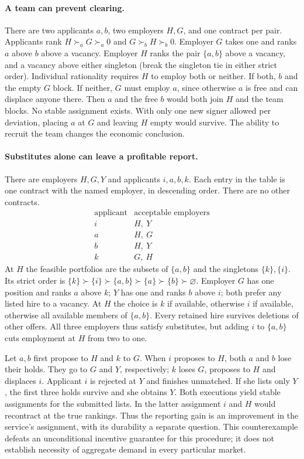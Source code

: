 \documentclass[11pt]{article}
\begin{document}
\paragraph{A team can prevent clearing.}
There are two applicants $a,b$, two employers $H,G$, and one contract per pair. Applicants rank $H\succ_a G\succ_a0$ and $G\succ_b H\succ_b0$. Employer $G$ takes one and ranks $a$ above $b$ above a vacancy. Employer $H$ ranks the pair $\{a,b\}$ above a vacancy, and a vacancy above either singleton (break the singleton tie in either strict order). Individual rationality requires $H$ to employ both or neither. If both, $b$ and the empty $G$ block. If neither, $G$ must employ $a$, since otherwise $a$ is free and can displace anyone there. Then $a$ and the free $b$ would both join $H$ and the team blocks. No stable assignment exists. With only one new signer allowed per deviation, placing $a$ at $G$ and leaving $H$ empty would survive. The ability to recruit the team changes the economic conclusion.

\paragraph{Substitutes alone can leave a profitable report.}
There are employers $H,G,Y$ and applicants $i,a,b,k$. Each entry in the table is one contract with the named employer, in descending order. There are no other contracts.
\[
\begin{array}{c|l}
\text{applicant}&\text{acceptable employers}\\ \hline
 i&H,\ Y\\ a&H,\ G\\ b&H,\ Y\\ k&G,\ H
\end{array}
\]
At $H$ the feasible portfolios are the subsets of $\{a,b\}$ and the singletons $\{k\},\{i\}$. Its strict order is
$\{k\}\succ\{i\}\succ\{a,b\}\succ\{a\}\succ\{b\}\succ\varnothing$.
Employer $G$ has one position and ranks $a$ above $k$; $Y$ has one and ranks $b$ above $i$; both prefer any listed hire to a vacancy. At $H$ the choice is $k$ if available, otherwise $i$ if available, otherwise all available members of $\{a,b\}$. Every retained hire survives deletions of other offers. All three employers thus satisfy substitutes, but adding $i$ to $\{a,b\}$ cuts employment at $H$ from two to one.

Let $a,b$ first propose to $H$ and $k$ to $G$. When $i$ proposes to $H$, both $a$ and $b$ lose their holds. They go to $G$ and $Y$, respectively; $k$ loses $G$, proposes to $H$ and displaces $i$. Applicant $i$ is rejected at $Y$ and finishes unmatched. If she lists only $Y$, the first three holds survive and she obtains $Y$. Both executions yield stable assignments for the submitted lists. In the latter assignment $i$ and $H$ would recontract at the true rankings. Thus the reporting gain is an improvement in the service's assignment, with its durability a separate question. This counterexample defeats an unconditional incentive guarantee for this procedure; it does not establish necessity of aggregate demand in every particular market.
\end{document}

